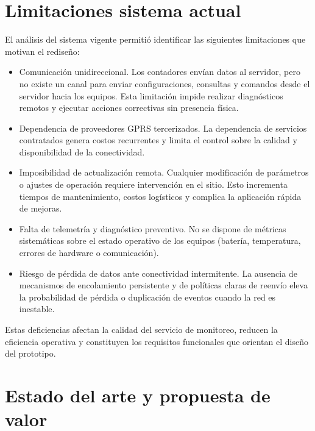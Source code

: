 
\section{Limitaciones sistema actual}

El análisis del sistema vigente permitió identificar las siguientes limitaciones que motivan el rediseño:

\begin{itemize}
\item  Comunicación unidireccional. Los contadores envían datos al servidor, pero no existe un canal para enviar configuraciones, consultas y comandos desde el servidor hacia los equipos. Esta limitación impide realizar diagnósticos remotos y ejecutar acciones correctivas sin presencia física.

\item  Dependencia de proveedores GPRS tercerizados. La dependencia de servicios contratados genera costos recurrentes y limita el control sobre la calidad y disponibilidad de la conectividad.

\item  Imposibilidad de actualización remota. Cualquier modificación de parámetros o ajustes de operación requiere intervención en el sitio. Esto incrementa tiempos de mantenimiento, costos logísticos y complica la aplicación rápida de mejoras.

\item  Falta de telemetría y diagnóstico preventivo. No se dispone de métricas sistemáticas sobre el estado operativo de los equipos (batería, temperatura, errores de hardware o comunicación).

\item Riesgo de pérdida de datos ante conectividad intermitente. La ausencia de mecanismos de encolamiento persistente y de políticas claras de reenvío eleva la probabilidad de pérdida o duplicación de eventos cuando la red es inestable.

\end{itemize}

Estas deficiencias afectan la calidad del servicio de monitoreo, reducen la eficiencia operativa y constituyen los requisitos funcionales que orientan el diseño del prototipo.


\section{Estado del arte y propuesta de valor}

